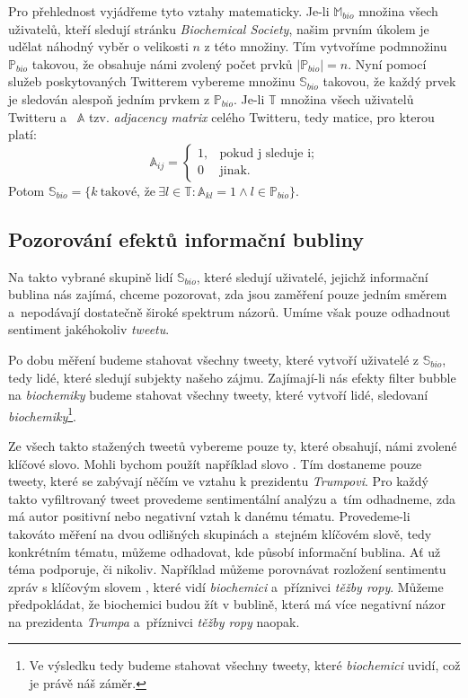 \documentclass[12pt, a4paper]{article}
\numberwithin{equation}{section} 	%
\begin{document}
Pro přehlednost vyjádřeme tyto vztahy matematicky. Je-li $\mathbb{M}_{bio}$ množina všech uživatelů, kteří sledují stránku \textit{Biochemical Society}, našim prvním úkolem je udělat náhodný vyběr o velikosti $n$ z této množiny. Tím vytvoříme podmnožinu $\mathbb{P}_{bio}$ takovou, že obsahuje námi zvolený počet prvků $\left\vert{\mathbb{P}_{bio}}\right\vert = n$. Nyní pomocí služeb poskytovaných Twitterem vybereme množinu $\mathbb{S}_{bio}$ takovou, že každý prvek je sledován alespoň jedním prvkem z $\mathbb{P}_{bio}$. Je-li $\mathbb{T}$ množina všech uživatelů Twitteru a~ $\mathbb{A}$ tzv. \textit{adjacency matrix} celého Twitteru, tedy matice, pro kterou platí:
\begin{equation}
    \mathbb{A}_{ij}=
    \begin{cases}
        1, &\text{pokud j sleduje i;}\\
        0 &\text{jinak.}
    \end{cases}
\end{equation}
Potom $\mathbb{S}_{bio} = \{k\ \text{takové, že}\ \exists l\in\mathbb{T}: \mathbb{A}_{kl} = 1 \wedge l\in\mathbb{P}_{bio} \}$.

\subsection{Pozorování efektů informační bubliny}
\noindent Na takto vybrané skupině lidí $\mathbb{S}_{bio}$, které sledují uživatelé, jejichž informační bublina nás zajímá, chceme pozorovat, zda jsou zaměření pouze jedním směrem a~nepodávají dostatečně široké spektrum názorů. Umíme však pouze odhadnout sentiment jakéhokoliv \textit{tweetu}.

Po dobu měření budeme stahovat všechny tweety, které vytvoří uživatelé z $\mathbb{S}_{bio}$, tedy lidé, které sledují subjekty našeho zájmu. Zajímají-li nás efekty filter bubble na \textit{biochemiky} budeme stahovat všechny tweety, které vytvoří lidé, sledovaní \textit{biochemiky}\footnote{Ve výsledku tedy budeme stahovat všechny tweety, které \textit{biochemici} uvidí, což je právě náš záměr.}.

Ze všech takto stažených tweetů vybereme pouze ty, které obsahují, námi zvolené klíčové slovo. Mohli bychom použít například slovo \textit{}. Tím dostaneme pouze tweety, které se zabývají něčím ve vztahu k prezidentu \textit{Trumpovi}. Pro každý takto vyfiltrovaný tweet provedeme sentimentální analýzu a~tím odhadneme, zda má autor positivní nebo negativní vztah k danému tématu. Provedeme-li takováto měření na dvou odlišných skupinách a~stejném klíčovém slově, tedy konkrétním tématu, můžeme odhadovat, kde působí informační bublina. Ať už téma podporuje, či nikoliv. Například můžeme porovnávat rozložení sentimentu zpráv s klíčovým slovem \textit{}, které vidí \textit{biochemici} a~příznivci \textit{těžby ropy}. Můžeme předpokládat, že biochemici budou žít v bublině, která má více negativní názor na prezidenta \textit{Trumpa} a~příznivci \textit{těžby ropy} naopak.
\end{document}
